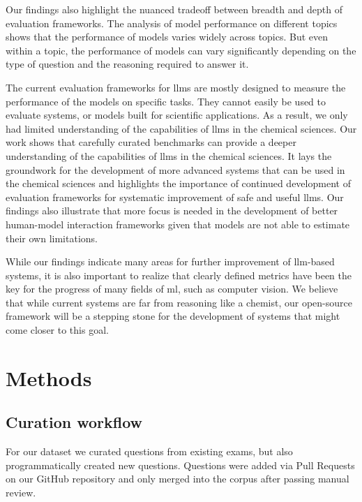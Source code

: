 \documentclass[11pt, oneside]{article}
\begin{document}
\begin{refsection}
Our findings also highlight the nuanced tradeoff between breadth and depth of evaluation frameworks. 
The analysis of model performance on different topics shows that the performance of models varies widely across topics. 
But even within a topic, the performance of models can vary significantly depending on the type of question and the reasoning required to answer it.

The current evaluation frameworks for \glspl{llm} are mostly designed to measure the performance of the models on specific tasks. 
They cannot easily be used to evaluate systems, or models built for scientific applications. As a result, we only had limited understanding of the capabilities of \glspl{llm} in the chemical sciences.
Our work shows that carefully curated benchmarks can provide a deeper understanding of the capabilities of \glspl{llm} in the chemical sciences.
It lays the groundwork for the development of more advanced systems that can be used in the chemical sciences and highlights the importance of continued development of evaluation frameworks for systematic improvement of safe and useful \glspl{llm}.
Our findings also illustrate that more focus is needed in the development of better human-model interaction frameworks given that models are not able to estimate their own limitations.

While our findings indicate many areas for further improvement of \gls{llm}-based systems, it is also important to realize that clearly defined metrics have been the key for the progress of many fields of \gls{ml}, such as computer vision. 
We believe that while current systems are far from reasoning like a chemist, our open-source \chembench framework will be a stepping stone for the development of systems that might come closer to this goal.

\clearpage

\section{Methods}

\subsection{Curation workflow}\label{sec:curation}
For our dataset we curated questions from existing exams, but also programmatically created new questions.
Questions were added via Pull Requests on our GitHub repository and only merged into the corpus after passing manual review.


\end{refsection}
\end{document}
